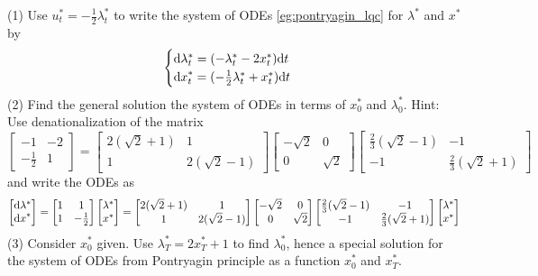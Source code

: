 \documentclass[11pt]{book}
\newcommand{\dd}{\text{\normalfont d}}
\newcommand{\dt}{\text{\normalfont d}t}
\newcommand{\dx}{\text{\normalfont d}x}
\begin{document}
\begin{ex}
    (1) Use $u^*_t=-\frac{1}{2}\lambda^*_t$ to write the system of ODEs \eqref{eg:pontryagin_lqc} for $\lambda^*$ and $x^*$ by
    \begin{equation}
        \begin{cases}
        {\dd}\lambda^*_t= (- \lambda^*_t - 2x^*_t){\dt}\\
        {\dx}^*_t=( -\frac12\lambda^*_t+x^*_t  ){\dt}
        \end{cases}
    \end{equation}
    (2) Find the general solution the system of ODEs in terms of $x^*_0$ and $\lambda^*_0$. Hint: Use denationalization of the matrix 
    \begin{equation}
        \left[
        \begin{matrix}
            -1&-2\\
            -\frac12&1
        \end{matrix}
        \right] =\left[\begin{matrix}2(\sqrt2+1)&1\\1&2(\sqrt2-1)\end{matrix}\right] \left[\begin{matrix}-\sqrt{2}&0\\0&\sqrt{2}\end{matrix}\right] \left[\begin{matrix}\frac23(\sqrt2-1)&-1\\-1&\frac23(\sqrt2+1)\end{matrix}\right]
    \end{equation}
    and write the ODEs as 
    \begin{equation}
        \left[\begin{matrix}{\dd}\lambda^*\\{\dx}^*\end{matrix}\right] = \left[
        \begin{matrix}
            1&1\\
            1&-\frac12
        \end{matrix}
        \right] 
        \left[\begin{matrix}\lambda^*\\x^*\end{matrix}\right] = \left[\begin{matrix}2(\sqrt2+1)&1\\1&2(\sqrt2-1)\end{matrix}\right] \left[\begin{matrix}-\sqrt{2}&0\\0&\sqrt{2}\end{matrix}\right] \left[\begin{matrix}\frac23(\sqrt2-1)&-1\\-1&\frac23(\sqrt2+1)\end{matrix}\right]\left[\begin{matrix}\lambda^*\\x^*\end{matrix}\right]
    \end{equation}
    (3) Consider $x^*_0$ given. Use $\lambda^*_T= 2x^*_T + 1$ to find $\lambda^*_0$, hence a special solution for the system of ODEs from Pontryagin principle as a function $x^*_0$ and $x^*_T$.  
\end{ex}
\end{document}
